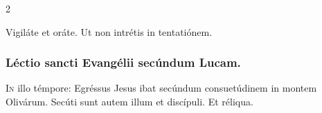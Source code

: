\documentclass[9pt,twoside]{extarticle}
\begin{document}
\begin{multicols}{2}
%
%
%
%
%
%
%
%
%
%
%
%
%
%
%
%
%
%
%

\begin{tightlist}{}
\item {} Vigiláte et oráte.  Ut non intrétis in tentatiónem.
\end{tightlist}

\subsubsection*{\center Léctio sancti Evangélii secúndum Lucam.}
\begin{center}\end{center}
\lettrine{I}n illo témpore: Egréssus Jesus ibat secúndum consuetúdinem in montem Olivárum. Secúti sunt autem illum et discípuli. Et réliqua.


\end{multicols}
\end{document}
